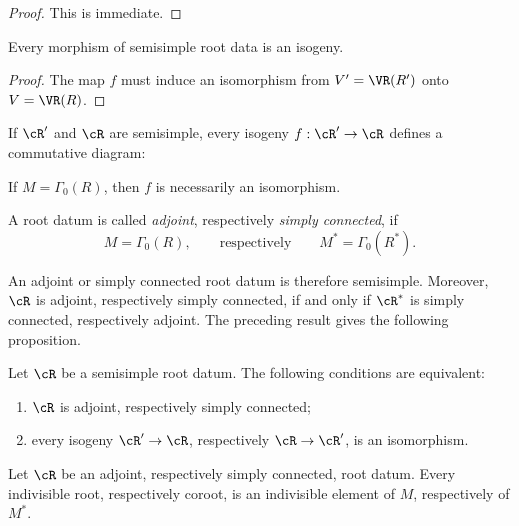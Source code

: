 \begin{proof}
This is immediate.
\end{proof}

\begin{lemma}\label{sga3:XXI:6.2.5}
Every morphism of semisimple root data is an isogeny.
\end{lemma}

\begin{proof}
The map \(f\) must induce an isomorphism from
\(V'=\VR(R')\) onto \(V=\VR(R)\).
\end{proof}

If \(\cR'\) and \(\cR\) are semisimple, every isogeny
\(f:\cR'\to\cR\) defines a commutative diagram:
\begin{center}
\end{center}
If \(M=\Gamma_0(R)\), then \(f\) is necessarily an isomorphism.

\begin{definition}\label{sga3:XXI:6.2.6}
A root datum is called \emph{adjoint}, respectively
\emph{simply connected}, if
\[
 M=\Gamma_0(R),
 \qquad\text{respectively}\qquad
 M^\ast=\Gamma_0(R^\ast).
\]
\end{definition}

An adjoint or simply connected root datum is therefore semisimple.
Moreover, \(\cR\) is adjoint, respectively simply connected, if and
only if \(\cR^\ast\) is simply connected, respectively adjoint. The
preceding result gives the following proposition.

\begin{proposition}\label{sga3:XXI:6.2.7}
Let \(\cR\) be a semisimple root datum. The following conditions are
equivalent:
\begin{enumerate}
\item[(i)] \(\cR\) is adjoint, respectively simply connected;
\item[(ii)] every isogeny \(\cR'\to\cR\), respectively
  \(\cR\to\cR'\), is an isomorphism.
\end{enumerate}
\end{proposition}

\begin{proposition}\label{sga3:XXI:6.2.8}
Let \(\cR\) be an adjoint, respectively simply connected, root datum.
Every indivisible root, respectively coroot, is an indivisible element
of \(M\), respectively of \(M^\ast\).
\end{proposition}

